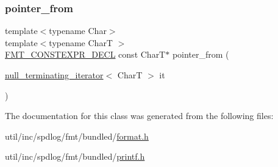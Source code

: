 \subsubsection{\texorpdfstring{pointer\+\_\+from}{pointer\_from}}
{\footnotesize\ttfamily template$<$typename Char$>$ \\
template$<$typename CharT $>$ \\
\hyperlink{core_8h_af4388801466a5994a363d6005616371a}{F\+M\+T\+\_\+\+C\+O\+N\+S\+T\+E\+X\+P\+R\+\_\+\+D\+E\+CL} const CharT$\ast$ pointer\+\_\+from (\begin{DoxyParamCaption}\item[{\hyperlink{classinternal_1_1null__terminating__iterator}{null\+\_\+terminating\+\_\+iterator}$<$ CharT $>$}]{it }\end{DoxyParamCaption})\hspace{0.3cm}{\ttfamily [friend]}}



The documentation for this class was generated from the following files\+:\begin{DoxyCompactItemize}
\item 
util/inc/spdlog/fmt/bundled/\hyperlink{format_8h}{format.\+h}\item 
util/inc/spdlog/fmt/bundled/\hyperlink{printf_8h}{printf.\+h}\end{DoxyCompactItemize}
